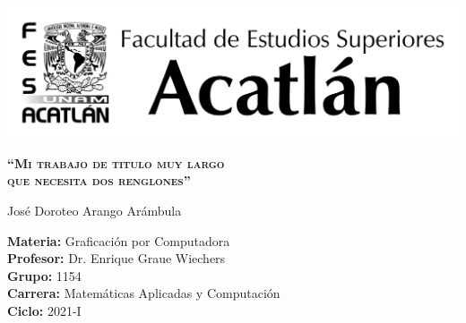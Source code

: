 \begin{titlepage}
\vspace*{-1.5cm}

\begin{center}
  \includegraphics[width=\textwidth]{img/logo-negro}
\end{center}

\vspace{1.5cm}

\begin{center}
  {\textsc{\LARGE {\bf ``Mi trabajo de titulo muy largo}}} \\
  {\textsc{\LARGE {\bf que necesita dos renglones''}}}
\end{center}

\vspace{2cm}

\begin{center}
  {\Large José Doroteo Arango Arámbula} \\
\end{center}

\vspace{5cm}

\begin{flushleft}
  {\large {\bf Materia:} Graficación por Computadora} \\
  {\large {\bf Profesor:} Dr. Enrique Graue Wiechers} \\
  {\large {\bf Grupo:} 1154} \\
  {\large {\bf Carrera:} Matemáticas Aplicadas y Computación} \\
  {\large {\bf Ciclo:} 2021-I}
\end{flushleft}

\end{titlepage}

